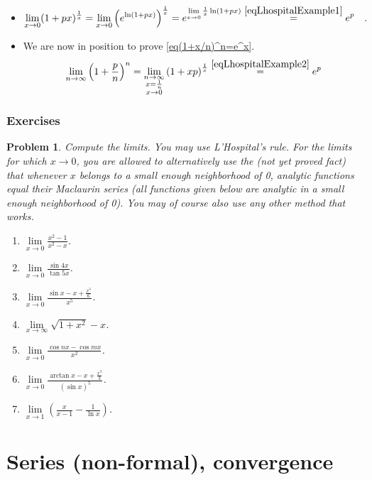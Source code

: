 \documentclass[12pt]{book}
\newtheorem{problem}{Problem}[section]
\begin{document}
\begin{itemize}
\item 
\begin{equation}\label{eqLhospitalExample2}
\lim\limits_{x\to 0}(1+px)^{\frac1x}= \lim\limits_{x\to 0} \left(e^{\ln (1+px)}\right)^{\frac1x} = e^{\lim\limits_{x\to 0}\frac{1}x\ln (1+px)} \stackrel{\eqref{eqLhospitalExample1}}{=}e^{p}\quad .
\end{equation}
\item We are now in position to prove \eqref{eq(1+x/n)^n=e^x}.
\[
\lim\limits_{n\to \infty} \left(1+\frac{p}{n}\right)^n= \lim_{\substack{n\to \infty \\ x=\frac{1}{n}\\x\to 0}} \left(1+xp\right)^{\frac{1}{x}} \stackrel{\eqref{eqLhospitalExample2}}{=}e^p
\]

\end{itemize}
\subsubsection{Exercises}
\begin{problem}
Compute the limits. You may use L'Hospital's rule. For the limits for which $x\to 0$, you are allowed to alternatively use the (not yet proved fact) that whenever $x$ belongs to a small enough neighborhood of 0, analytic functions equal their Maclaurin series (all functions given below are analytic in a small enough neighborhood of 0). You may of course also use any other method that works.
\begin{enumerate}
\item $\lim\limits_{x\to 0} \frac{x^2-1}{x^2-x}$.
\item $\lim\limits_{x\to 0} \frac{\sin 4 x}{\tan 5x}$.
\item $\lim\limits_{x\to 0} \frac{\sin x - x +\frac{x^3}{6}}{x^5}$.
\item $\lim\limits_{x\to \infty} \sqrt{1+x^2} - x$.
\item $\lim\limits_{x\to 0} \frac{\cos n x - \cos mx }{x^2}$.
\item $\lim\limits_{x\to 0} \frac{\arctan x - x+ \frac{x^3}{3} }{(\sin x)^5}$.
\item $\lim\limits_{x\to 1}\left(\frac{x}{x-1}- \frac{1}{\ln x} \right)$.
\end{enumerate}
\end{problem}

\section{Series (non-formal), convergence}\label{secSeriesConvergence}
\end{document}
